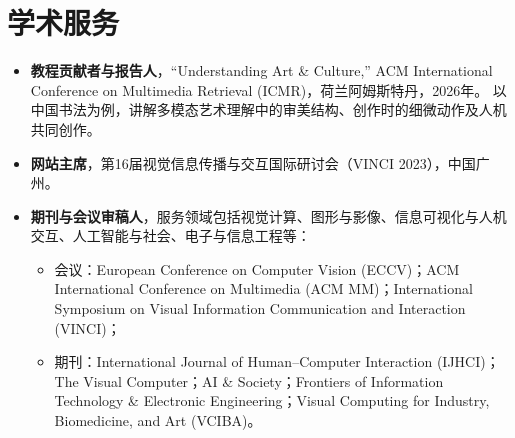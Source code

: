 \section*{学术服务}

\begin{itemize}[leftmargin=*]
    \item \noindent\textbf{教程贡献者与报告人}，“Understanding Art \& Culture,” ACM International Conference on Multimedia Retrieval (ICMR)，荷兰阿姆斯特丹，2026年。
    以中国书法为例，讲解多模态艺术理解中的审美结构、创作时的细微动作及人机共同创作。

    \item \textbf{网站主席}，第16届视觉信息传播与交互国际研讨会（VINCI 2023），中国广州。
    \item \noindent \textbf{期刊与会议审稿人}，服务领域包括视觉计算、图形与影像、信息可视化与人机交互、人工智能与社会、电子与信息工程等：
    \begin{itemize}
         \item 会议：European Conference on Computer Vision (ECCV)；ACM International Conference on Multimedia (ACM MM)；International Symposium on Visual Information Communication and Interaction (VINCI)；
         \item 期刊：International Journal of Human--Computer Interaction (IJHCI)；The Visual Computer；AI \& Society；Frontiers of Information Technology \& Electronic Engineering；Visual Computing for Industry, Biomedicine, and Art (VCIBA)。
    \end{itemize}
\end{itemize}
